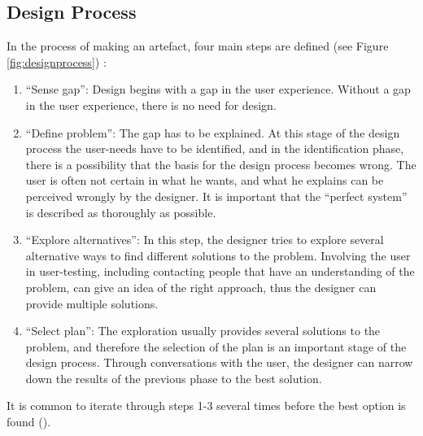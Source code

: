 \subsection{Design Process}
\label{sec:designprocess}
In the process of making an artefact, four main steps are defined (see Figure \ref{fig:designprocess}) :
\begin{enumerate}
 \item ``Sense gap'': Design begins with a gap in the user experience. Without a gap in the user experience, there is no need for design.
 \item ``Define problem'': The gap has to be explained. At this stage of the design process the user-needs have to be identified, and in the identification phase, there is a possibility that the basis for the design process becomes wrong. The user is often not certain in what he wants, and what he explains can be perceived wrongly by the designer. It is important that the ``perfect system'' is described as thoroughly as possible.
 \item ``Explore alternatives'': In this step, the designer tries to explore several alternative ways to find different solutions to the problem. Involving the user in user-testing, including contacting people that have an understanding of the problem, can give an idea of the right approach, thus the designer can provide multiple solutions.
 \item ``Select plan'': The exploration usually provides several solutions to the problem, and therefore the selection of the plan is an important stage of the design process. Through conversations with the user, the designer can narrow down the results of the previous phase to the best solution.
 \end{enumerate}
 It is common to iterate through steps 1-3 several times before the best option is found (\cite{ulrich}).
 
